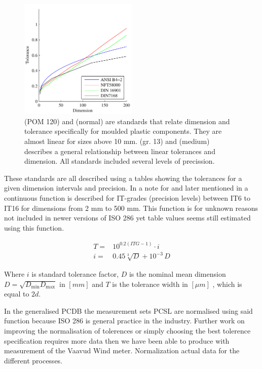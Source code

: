 \documentclass[aip,amsmath, reprint, author-year]{revtex4-1}
\begin{document}
\begin{figure}
\includegraphics[width=0.5\textwidth]{Tolerance_standards.pdf}
\caption{\label{fig:tolstd} \citeauthor{DIN16901} (POM 120) and \citeauthor{NFT58000} (normal) are standards that relate dimension and tolerance specifically for moulded plastic components. They are almost linear for sizes above 10 mm. 
\citeauthor{american1978preferred} (gr. 13) and \citeauthor{DIN7168} (medium) describes a general relationship between linear tolerances and dimension. All standards included several levels of precission.}
\end{figure}

These standards are all described using a tables showing the tolerances for a given dimension intervals and precision. 
In a note for \citeauthor{american1978preferred} and later mentioned in \citeauthor{ISO286} a continuous function is described for IT-grades (precision levels) between IT6 to IT16 for dimensions from 2 mm to 500 mm. 
This function is for unknown reasons not included in newer versions of ISO 286 yet table values seems still estimated using this function.

\begin{align}
	T =& 10^{0.2 (ITG -1)} \cdot i \\
	i =& 0.45 \sqrt[3]{D} + 10^{-3} \, D 
\end{align}

Where $i$ is standard tolerance factor, $D$ is the nominal mean dimension $D = \sqrt{D_{\textrm{min}} D_\textrm{max}}$ in $[mm]$ and $T $ is the tolerance width in $[\mu m]$ , which is equal to $2d$. 

In the generalised PCDB the measurement sets PCSL are normalised using said function because ISO 286 is general practice in the industry. 
Further work on improving the normalisation of tolerences or simply choosing the best tolerence specification requires more data then we have been able to produce with measurement of the Vaavud Wind meter. Normalization actual data for the different processes.
\end{document}
